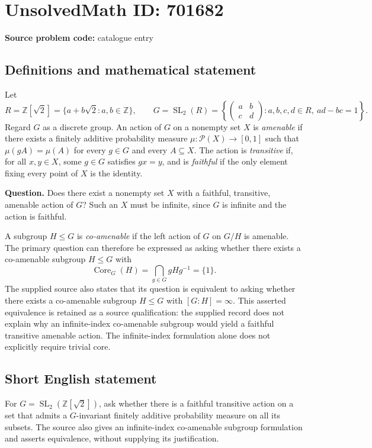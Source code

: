 \documentclass[11pt]{article}
\newcommand{\Z}{\mathbb{Z}}
\begin{document}
\section*{UnsolvedMath ID: 701682}
\textbf{Source problem code:} catalogue entry
\subsection{Definitions and mathematical statement}
Let
\[
R=\Z[\sqrt{2}]=\{a+b\sqrt{2}:a,b\in\Z\},\qquad
G=\operatorname{SL}_2(R)=\left\{\begin{pmatrix}a&b\\c&d\end{pmatrix}:a,b,c,d\in R,\ ad-bc=1\right\}.
\]
Regard \(G\) as a discrete group. An action of \(G\) on a nonempty set \(X\) is \emph{amenable} if there exists a finitely additive probability measure \(\mu:\mathcal P(X)\to[0,1]\) such that \(\mu(gA)=\mu(A)\) for every \(g\in G\) and every \(A\subseteq X\). The action is \emph{transitive} if, for all \(x,y\in X\), some \(g\in G\) satisfies \(gx=y\), and is \emph{faithful} if the only element fixing every point of \(X\) is the identity.

\textbf{Question.} Does there exist a nonempty set \(X\) with a faithful, transitive, amenable action of \(G\)? Such an \(X\) must be infinite, since \(G\) is infinite and the action is faithful.

A subgroup \(H\leq G\) is \emph{co-amenable} if the left action of \(G\) on \(G/H\) is amenable. The primary question can therefore be expressed as asking whether there exists a co-amenable subgroup \(H\leq G\) with
\[
\operatorname{Core}_G(H)=\bigcap_{g\in G}gHg^{-1}=\{1\}.
\]
The supplied source also states that its question is equivalent to asking whether there exists a co-amenable subgroup \(H\leq G\) with \([G:H]=\infty\). This asserted equivalence is retained as a source qualification: the supplied record does not explain why an infinite-index co-amenable subgroup would yield a faithful transitive amenable action. The infinite-index formulation alone does not explicitly require trivial core.
\subsection{Short English statement}
For \(G=\operatorname{SL}_2(\Z[\sqrt{2}])\), ask whether there is a faithful transitive action on a set that admits a \(G\)-invariant finitely additive probability measure on all its subsets. The source also gives an infinite-index co-amenable subgroup formulation and asserts equivalence, without supplying its justification.
\end{document}
